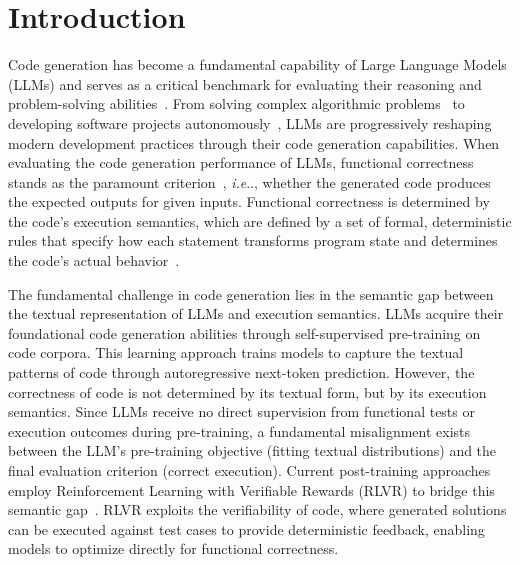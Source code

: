 \documentclass{article}
\makeatletter
\DeclareRobustCommand\onedot{\futurelet\@let@token\@onedot}
\def\@onedot{\ifx\@let@token.\else.\null\fi\xspace}
\def\ie{\emph{i.e}\onedot} \def\Ie{\emph{i.e}\onedot}
\theoremstyle{definition}
\theoremstyle{remark}
\makeatother
\begin{document}
\section{Introduction}
Code generation has become a fundamental capability of Large Language Models (LLMs) and serves as a critical benchmark for evaluating their reasoning and problem-solving abilities~\citep{guo2025deepseek, gemini2.5, gpt4}. From solving complex algorithmic problems~\citep{alphacode,codereval} to developing software projects autonomously~\citep{Self-Collaboration,Self-Planning,classgen,Agent4code}, LLMs are progressively reshaping modern development practices through their code generation capabilities. When evaluating the code generation performance of LLMs, functional correctness stands as the paramount criterion~\citep{function_style,chatgptcode,codereval}, \ie, whether the generated code produces the expected outputs for given inputs. Functional correctness is determined by the code's execution semantics, which are defined by a set of formal, deterministic rules that specify how each statement transforms program state and determines the code's actual behavior~\citep{jain2024livecodebench}.

The fundamental challenge in code generation lies in the semantic gap between the textual representation of LLMs and execution semantics. LLMs acquire their foundational code generation abilities through self-supervised pre-training on code corpora. 
This learning approach trains models to capture the textual patterns of code through autoregressive next-token prediction. However, the correctness of code is not determined by its textual form, but by its execution semantics. Since LLMs receive no direct supervision from functional tests or execution outcomes during pre-training, a fundamental misalignment exists between the LLM's pre-training objective (fitting textual distributions) and the final evaluation criterion (correct execution). Current post-training approaches employ Reinforcement Learning with 
Verifiable Rewards (RLVR) to bridge this semantic gap~\citep{tester_coder,RLVR-limit}. 
RLVR exploits the verifiability of code, where generated solutions can be executed against test cases to provide deterministic feedback, enabling models to optimize directly for functional correctness.
\end{document}
